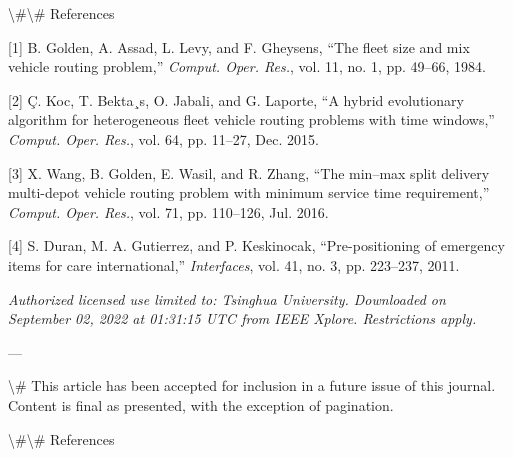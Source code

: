 \documentclass{article}
\begin{document}
	\textbackslash{}#\textbackslash{}# References
	
	[1] B. Golden, A. Assad, L. Levy, and F. Gheysens, “The fleet size and mix vehicle routing problem,” \textit{Comput. Oper. Res.}, vol. 11, no. 1, pp. 49–66, 1984.
	
	[2] Ç. Koc, T. Bekta¸s, O. Jabali, and G. Laporte, “A hybrid evolutionary algorithm for heterogeneous fleet vehicle routing problems with time windows,” \textit{Comput. Oper. Res.}, vol. 64, pp. 11–27, Dec. 2015.
	
	[3] X. Wang, B. Golden, E. Wasil, and R. Zhang, “The min–max split delivery multi-depot vehicle routing problem with minimum service time requirement,” \textit{Comput. Oper. Res.}, vol. 71, pp. 110–126, Jul. 2016.
	
	[4] S. Duran, M. A. Gutierrez, and P. Keskinocak, “Pre-positioning of emergency items for care international,” \textit{Interfaces}, vol. 41, no. 3, pp. 223–237, 2011.
	
	\textit{Authorized licensed use limited to: Tsinghua University. Downloaded on September 02, 2022 at 01:31:15 UTC from IEEE Xplore. Restrictions apply.}
	
	---
	
	\textbackslash{}# This article has been accepted for inclusion in a future issue of this journal. Content is final as presented, with the exception of pagination.
	
	\textbackslash{}#\textbackslash{}# References
	
\end{document}
